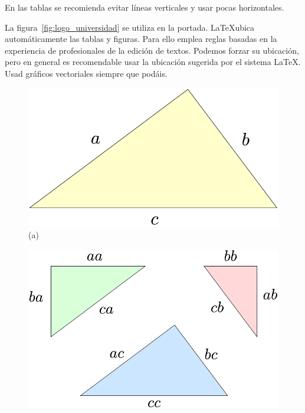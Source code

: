 En las tablas se recomienda evitar líneas verticales y usar pocas horizontales. 

La figura~\ref{fig:logo_universidad} se utiliza en la portada. \LaTeX ubica automáticamente las tablas y figuras. Para ello emplea reglas basadas en la experiencia de profesionales de la edición de textos. Podemos forzar su ubicación, pero en general es recomendable usar la ubicación sugerida por el sistema \LaTeX. Usad gráficos vectoriales siempre que podáis.





\begin{figure}
   \centering

  \begin{minipage}{0.45\textwidth}
   \centering

     \includegraphics[clip=true,width=\textwidth]{triangulo_grande_bb.pdf}\\

    \footnotesize (a)
  \end{minipage}
  \hfill
  \begin{minipage}{0.45\textwidth}
   \centering
     \includegraphics[clip=true,width=\textwidth]{triangulos_separados_bb.pdf}\\


\end{minipage}
\end{figure}
